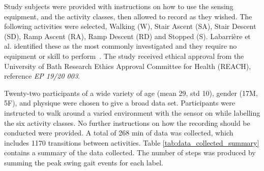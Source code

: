Study subjects were provided with instructions on how to use the sensing equipment, and the activity classes, then allowed to record as they wished. The following activities were selected, Walking (W), Stair Ascent (SA), Stair Descent (SD), Ramp Ascent (RA), Ramp Descent (RD) and Stopped (S). Labarri\`ere et al. identified these as the most commonly investigated and they require no equipment or skill to perform~\cite{Labarriere2020}. The study received ethical approval from the University of Bath Research Ethics Approval Committee for Health (REACH), reference \textit{EP 19/20 003}.

Twenty-two participants of a wide variety of age (mean 29, std 10), gender (17M, 5F), and physique were chosen to give a broad data set. Participants were instructed to walk around a varied environment with the sensor on while labelling the six activity classes. No further instructions on how the recording should be conducted were provided. A total of 268 min  of data was collected, which includes 1170 transitions between activities. Table \ref{tab:data_collected_summary} contains a summary of the data collected. The number of steps was produced by summing the peak swing gait events for each label.

